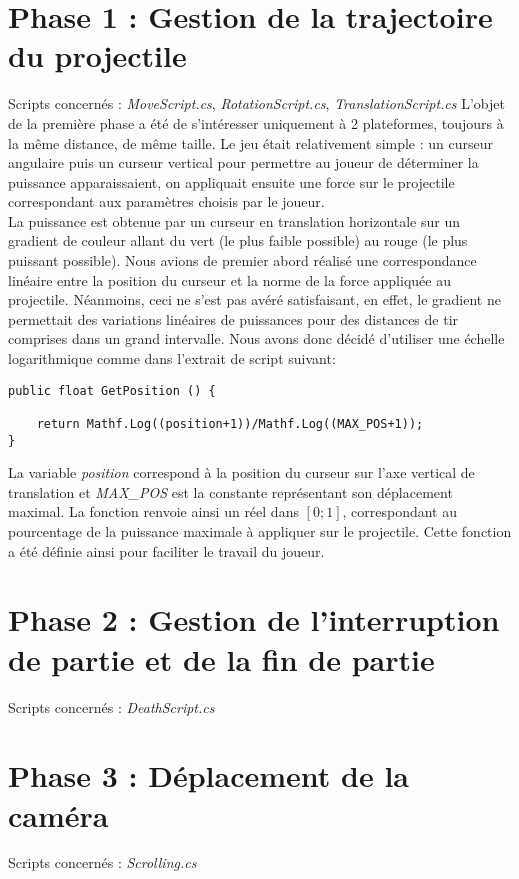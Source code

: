 \documentclass[12pt,a4paper]{report}
\begin{document}
\section{Phase 1 : Gestion de la trajectoire du projectile}
Scripts concernés : \textit{MoveScript.cs}, \textit{RotationScript.cs}, \textit{TranslationScript.cs}\newline
\newline
L'objet de la première phase a été de s'intéresser uniquement à 2 plateformes, toujours à la même distance, de même taille. Le jeu était relativement simple : un curseur angulaire puis un curseur vertical pour permettre au joueur de déterminer la puissance apparaissaient, on appliquait  ensuite une force sur le projectile correspondant aux paramètres choisis par le joueur.\\

La puissance est obtenue par un curseur en translation horizontale sur un gradient de couleur allant du vert (le plus faible possible) au rouge (le plus puissant possible). Nous avions de premier abord réalisé une correspondance linéaire entre la position du curseur et la norme de la force appliquée au projectile. Néanmoins, ceci ne s'est pas avéré satisfaisant, en effet, le gradient ne permettait des variations linéaires de puissances pour  des distances de tir comprises dans un grand intervalle. Nous avons donc décidé d'utiliser une échelle logarithmique comme dans l'extrait de script suivant:

 
  \begin{lstlisting}
public float GetPosition () {

	return Mathf.Log((position+1))/Mathf.Log((MAX_POS+1));
}  \end{lstlisting}

La variable \textit{position} correspond à la position du curseur sur l'axe vertical de translation et \textit{MAX\_POS} est la constante représentant son déplacement maximal. La fonction renvoie ainsi un réel dans $\left[0;1\right]$, correspondant au pourcentage de la puissance maximale à appliquer sur le projectile. Cette fonction a été définie ainsi pour faciliter le travail du joueur.

\section{Phase 2 : Gestion de l'interruption de partie et de la fin de partie}
Scripts concernés : \textit{DeathScript.cs}
\section{Phase 3 : Déplacement de la caméra}
Scripts concernés : \textit{Scrolling.cs}
\end{document}
